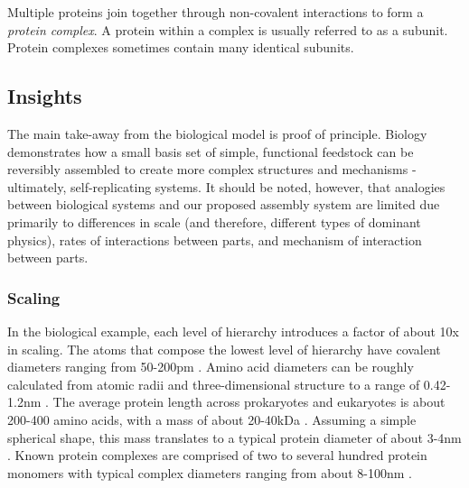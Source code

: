 {Multiple proteins join together through non-covalent interactions to form a \textit{protein complex}.  A protein within a complex is usually referred to as a subunit.  Protein complexes sometimes contain many identical subunits.

\subsection{Insights}

The main take-away from the biological model is proof of principle.  Biology demonstrates how a small basis set of simple, functional feedstock can be reversibly assembled to create more complex structures and mechanisms - ultimately, self-replicating systems.  It should be noted, however, that analogies between biological systems and our proposed assembly system are limited due primarily to differences in scale (and therefore, different types of dominant physics), rates of interactions between parts, and mechanism of interaction between parts.

\subsubsection{Scaling}

In the biological example, each level of hierarchy introduces a factor of about 10x in scaling.  The atoms that compose the lowest level of hierarchy have covalent diameters ranging from 50-200pm  \cite{Slater1993}.  Amino acid diameters can be roughly calculated from atomic radii and three-dimensional structure to a range of 0.42-1.2nm  \cite{Pool2003}.  The average protein length across prokaryotes and eukaryotes is about 200-400 amino acids, with a mass of about 20-40kDa  \cite{Brocchieri2005}.  Assuming a simple spherical shape, this mass translates to a typical protein diameter of about 3-4nm  \cite{Erickson2009}.  Known protein complexes are comprised of two to several hundred protein monomers with typical complex diameters ranging from about 8-100nm  \cite{Yang2010a}.

%

}
